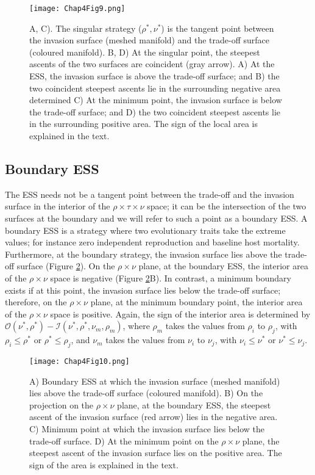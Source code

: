 \documentclass[11.5pt]{article}
\begin{document}
\begin{figure}[H]
    \centering
    \texttt{[image: Chap4Fig9.png]}
    \caption[Intermediate singular strategy]{A, C). The singular strategy ($\rho^*, \nu^*$) is the tangent point between the invasion surface (meshed manifold) and the trade-off surface (coloured manifold). B, D) At the singular point, the steepest ascents of the two surfaces are coincident (gray arrow). A) At the ESS, the invasion surface is above the trade-off surface; and B) the two coincident steepest ascents lie in the surrounding negative area determined C) At the minimum point, the invasion surface is below the trade-off surface; and D) the two coincident steepest ascents lie in the surrounding positive area. The sign of the local area is explained in the text.}
    \label{Chap5fig9}
\end{figure}

\subsection{Boundary ESS}

The ESS needs not be a tangent point between the trade-off and the invasion surface in the interior of the $\rho \times \tau \times \nu$ space; it can be the intersection of the two surfaces at the boundary and we will refer to such a point as a boundary ESS. A boundary ESS is a strategy where two evolutionary traits take the extreme values; for instance zero independent reproduction and baseline host mortality. Furthermore, at the boundary strategy, the invasion surface lies above the trade-off surface (Figure \ref{Chap5fig10}). On the $\rho \times \nu $ plane, at the boundary ESS, the interior area of the $\rho \times \nu$ space is negative (Figure \ref{Chap5fig10}B). In contrast, a minimum boundary exists if at this point, the invasion surface lies below the trade-off surface; therefore, on the $\rho \times \nu $ plane, at the minimum boundary point, the interior area of the $\rho \times \nu$ space is positive. Again, the sign of the interior area is determined by  $\mathcal{O}(\nu^*, \rho^*) - \mathcal{I}(\nu^*, \rho^*, \nu_m, \rho_m)$, where $\rho_m$ takes the values from $\rho_i$ to $\rho_j$, with $\rho_i \leq \rho^*$ or $\rho^* \leq \rho_j$, and $\nu_m$ takes the values from $\nu_i$ to $\nu_j$, with $\nu_i \leq \nu^*$ or $\nu^* \leq \nu_j$.

\begin{figure}[H]
    \centering
    \texttt{[image: Chap4Fig10.png]}
    \caption[Boundary singular strategy]{A) Boundary ESS at which the invasion surface (meshed manifold) lies above the trade-off surface (coloured manifold). B) On the projection on the $\rho \times \nu$ plane, at the boundary ESS, the steepest ascent of the invasion surface (red arrow) lies in the negative area. C) Minimum point at which the invasion surface lies below the trade-off surface. D) At the minimum point on the $\rho \times \nu$ plane, the steepest ascent of the invasion surface lies on the positive area. The sign of the area is explained in the text.}
    \label{Chap5fig10}
\end{figure}
\end{document}
